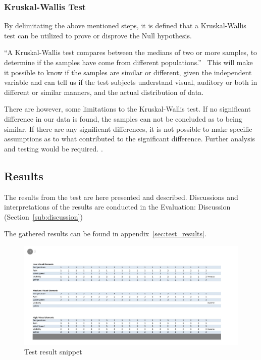 \subsubsection{Kruskal-Wallis Test} %
\label{ssub:kruskal_wallis_test}

By delimitating the above mentioned steps, it is defined that a Kruskal-Wallis test can be utilized to prove or disprove the Null hypothesis.


\enquote{A Kruskal-Wallis test compares between the medians of two or more samples, to determine if the samples have come from different populations.}~\cite{Gaten2000}
This will make it possible to know if the samples are similar or different, given the independent variable and can tell us if the test subjects understand visual, auditory or both in different or similar manners, and the actual distribution of data.


There are however, some limitations to the Kruskal-Wallis test.
If no significant difference in our data is found, the samples can not be concluded as to being similar.
If there are any significant differences, it is not possible to make specific assumptions as to what contributed to the significant difference. 
Further analysis and testing would be required. \cite*{Gaten2000}.





\subsection{Results} %
\label{sub:results}

The results from the test are here presented and described. 
Discussions and interpretations of the results are conducted in the Evaluation: Discussion (Section~\ref{sub:discussion})

The gathered results can be found in appendix~\ref{sec:test_results}.

\begin{figure}[!htbp]
    \centering
    \includegraphics[width=1\textwidth]{images/Evaluation1.jpg}
    \caption{Test result snippet}
    \label{fig:evaluation1}
\end{figure}

